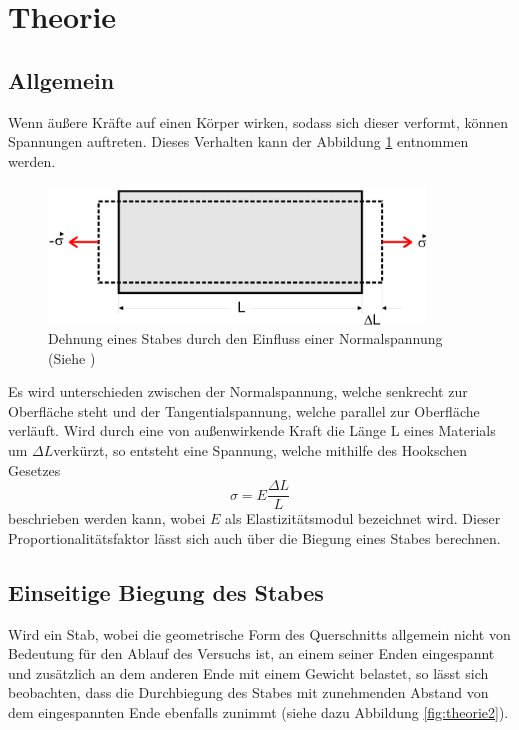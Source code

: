 \section{Theorie}
\label{sec:Theorie}

\subsection{Allgemein}

Wenn äußere Kräfte auf einen Körper wirken, sodass 
sich dieser verformt, können Spannungen auftreten.
Dieses Verhalten kann der Abbildung \ref{fig:theorie1}
entnommen werden.

\begin{figure}[h]
    \centering
    \includegraphics[width=10cm]{Theorie1.png}
    \caption{Dehnung eines Stabes durch den Einfluss einer Normalspannung (Siehe \cite{sample})}
      \label{fig:theorie1}
\end{figure}
\noindent
Es wird unterschieden zwischen der Normalspannung,
welche senkrecht zur Oberfläche steht und der 
Tangentialspannung, welche parallel zur Oberfläche 
verläuft. Wird durch eine von außenwirkende Kraft 
die Länge L eines Materials um $\Delta L $verkürzt, 
so entsteht eine Spannung, welche mithilfe
des Hookschen Gesetzes
\begin{equation}
    \sigma = E \frac{\Delta L}{L}
    \label{eq:1}
\end{equation}
\noindent beschrieben werden kann, wobei $E$ als
Elastizitätsmodul bezeichnet wird. Dieser 
Proportionalitätsfaktor lässt sich auch über die 
Biegung eines Stabes berechnen.


\subsection{Einseitige Biegung des Stabes}

Wird ein Stab, wobei die geometrische Form des 
Querschnitts allgemein nicht von Bedeutung für den
Ablauf des Versuchs ist, an einem seiner Enden
eingespannt und zusätzlich an dem anderen Ende mit 
einem Gewicht belastet, so lässt sich beobachten,
dass die Durchbiegung des Stabes mit zunehmenden
Abstand von dem eingespannten Ende ebenfalls 
zunimmt (siehe dazu Abbildung \ref{fig:theorie2}).

